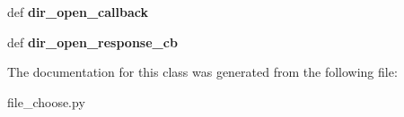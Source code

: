 \begin{DoxyCompactItemize}
\item 
\hypertarget{classfile__choose_1_1MyWindow_a657ca80f3210e8a5fdbf42b64d1d436a}{def {\bfseries dir\-\_\-open\-\_\-callback}}\label{classfile__choose_1_1MyWindow_a657ca80f3210e8a5fdbf42b64d1d436a}

\item 
\hypertarget{classfile__choose_1_1MyWindow_a1b83bd11148874738d06c6793ac5dc0a}{def {\bfseries dir\-\_\-open\-\_\-response\-\_\-cb}}\label{classfile__choose_1_1MyWindow_a1b83bd11148874738d06c6793ac5dc0a}

\end{DoxyCompactItemize}


The documentation for this class was generated from the following file\-:\begin{DoxyCompactItemize}
\item 
file\-\_\-choose.\-py\end{DoxyCompactItemize}

